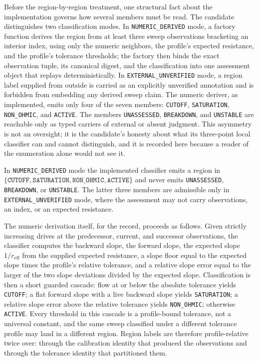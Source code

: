 Before the region-by-region treatment, one structural fact about the
implementation governs how several members must be
read. The candidate distinguishes two classification modes. In
\texttt{NUMERIC\_DERIVED} mode, a factory function derives the region from at
least three sweep observations bracketing an interior index, using only the
numeric neighbors, the profile's expected resistance, and the profile's
tolerance thresholds; the factory then binds the exact observation tuple, its
canonical digest, and the classification into one assessment object that
replays deterministically. In \texttt{EXTERNAL\_UNVERIFIED} mode, a region
label supplied from outside is carried as an explicitly unverified annotation
and is forbidden from embedding any derived sweep claim. The numeric deriver,
as implemented, emits only four of the seven members: \texttt{CUTOFF},
\texttt{SATURATION}, \texttt{NON\_OHMIC}, and \texttt{ACTIVE}. The members
\texttt{UNASSESSED}, \texttt{BREAKDOWN}, and \texttt{UNSTABLE} are reachable
only as typed carriers of external or absent judgment. This asymmetry is not
an oversight; it is the candidate's honesty about what its three-point local
classifier can and cannot distinguish, and it is recorded here because a
reader of the enumeration alone would not see it.

\begin{invariant}\label{ch07:inv:numeric-subset}
In \texttt{NUMERIC\_DERIVED} mode the implemented classifier emits a region
in $\{\texttt{CUTOFF}, \texttt{SATURATION}, \texttt{NON\_OHMIC},
\texttt{ACTIVE}\}$ and never emits \texttt{UNASSESSED}, \texttt{BREAKDOWN},
or \texttt{UNSTABLE}. The latter three members are admissible only in
\texttt{EXTERNAL\_UNVERIFIED} mode, where the assessment may not carry
observations, an index, or an expected resistance.
\end{invariant}

The numeric derivation itself, for the record, proceeds as follows. Given
strictly increasing drives at the predecessor, current, and successor
observations, the classifier computes the backward slope, the forward slope,
the expected slope $1/r_{\mathrm{eff}}$ from the supplied expected
resistance, a slope floor equal to the expected slope times the profile's
relative tolerance, and a relative slope error equal to the larger of the two
slope deviations divided by the expected slope. Classification is then a
short guarded cascade: flow at or below the absolute tolerance yields
\texttt{CUTOFF}; a flat forward slope with a live backward slope yields
\texttt{SATURATION}; a relative slope error above the relative tolerance
yields \texttt{NON\_OHMIC}; otherwise \texttt{ACTIVE}. Every threshold in
this cascade is a profile-bound tolerance, not a universal constant, and the
same sweep classified under a different tolerance profile may land in a
different region. Region labels are therefore profile-relative twice over:
through the calibration identity that produced the observations and through
the tolerance identity that partitioned them.

